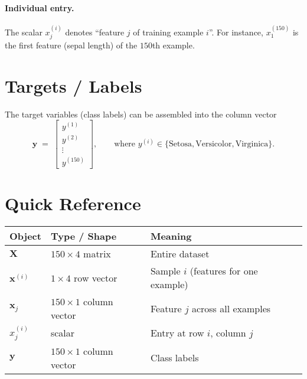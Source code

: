 \documentclass[11pt]{article}
\begin{document}
\paragraph{Individual entry.}
The scalar $x^{(i)}_j$ denotes ``feature $j$ of training example $i$''. For instance, $x^{(150)}_1$ is the first feature (sepal length) of the $150$th example.

\section*{Targets / Labels}
The target variables (class labels) can be assembled into the column vector
\begin{equation*}
  \bm{y} \;=\; \begin{bmatrix}
    y^{(1)} \\
    y^{(2)} \\
    \vdots \\
    y^{(150)}
  \end{bmatrix},
  \qquad
  \text{where } y^{(i)} \in \{\text{Setosa}, \text{Versicolor}, \text{Virginica}\}.
\end{equation*}

\section*{Quick Reference}
\begin{center}
\begin{tabular}{@{}lll@{}}
\toprule
Object & Type / Shape & Meaning \\
\midrule
$\bm{X}$ & $150 \times 4$ matrix & Entire dataset \\
$\bm{x}^{(i)}$ & $1 \times 4$ row vector & Sample $i$ (features for one example) \\
$\bm{x}_j$ & $150 \times 1$ column vector & Feature $j$ across all examples \\
$x^{(i)}_j$ & scalar & Entry at row $i$, column $j$ \\
$\bm{y}$ & $150 \times 1$ column vector & Class labels \\
\bottomrule
\end{tabular}
\end{center}
\end{document}
